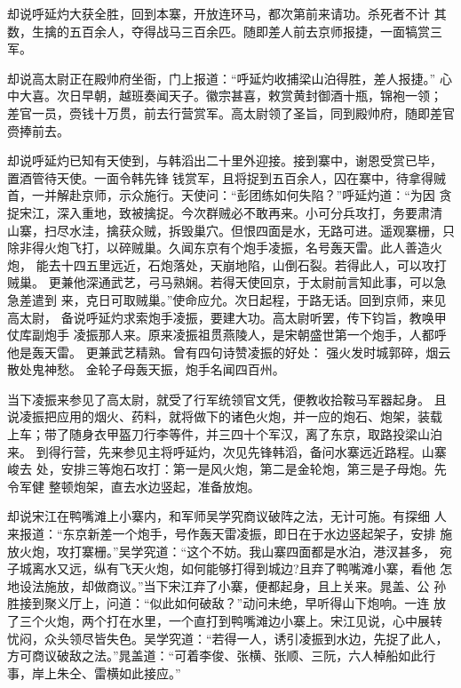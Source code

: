 却说呼延灼大获全胜，回到本寨，开放连环马，都次第前来请功。杀死者不计
其数，生擒的五百余人，夺得战马三百余匹。随即差人前去京师报捷，一面犒赏三
军。

却说高太尉正在殿帅府坐衙，门上报道：“呼延灼收捕梁山泊得胜，差人报捷。”
心中大喜。次日早朝，越班奏闻天子。徽宗甚喜，敕赏黄封御酒十瓶，锦袍一领；
差官一员，赍钱十万贯，前去行营赏军。高太尉领了圣旨，同到殿帅府，随即差官
赍捧前去。

却说呼延灼已知有天使到，与韩滔出二十里外迎接。接到寨中，谢恩受赏已毕，
置酒管待天使。一面令韩先锋钱赏军，且将捉到五百余人，囚在寨中，待拿得贼
首，一并解赴京师，示众施行。天使问：“彭团练如何失陷？”呼延灼道：“为因
贪捉宋江，深入重地，致被擒捉。今次群贼必不敢再来。小可分兵攻打，务要肃清
山寨，扫尽水洼，擒获众贼，拆毁巢穴。但恨四面是水，无路可进。遥观寨栅，只
除非得火炮飞打，以碎贼巢。久闻东京有个炮手凌振，名号轰天雷。此人善造火炮，
能去十四五里远近，石炮落处，天崩地陷，山倒石裂。若得此人，可以攻打贼巢。
更兼他深通武艺，弓马熟娴。若得天使回京，于太尉前言知此事，可以急急差遣到
来，克日可取贼巢。”使命应允。次日起程，于路无话。回到京师，来见高太尉，
备说呼延灼求索炮手凌振，要建大功。高太尉听罢，传下钧旨，教唤甲仗库副炮手
凌振那人来。原来凌振祖贯燕陵人，是宋朝盛世第一个炮手，人都呼他是轰天雷。
更兼武艺精熟。曾有四句诗赞凌振的好处：
强火发时城郭碎，烟云散处鬼神愁。
金轮子母轰天振，炮手名闻四百州。

当下凌振来参见了高太尉，就受了行军统领官文凭，便教收拾鞍马军器起身。
且说凌振把应用的烟火、药料，就将做下的诸色火炮，并一应的炮石、炮架，装载
上车；带了随身衣甲盔刀行李等件，并三四十个军汉，离了东京，取路投梁山泊来。
到得行营，先来参见主将呼延灼，次见先锋韩滔，备问水寨远近路程。山寨峻去
处，安排三等炮石攻打：第一是风火炮，第二是金轮炮，第三是子母炮。先令军健
整顿炮架，直去水边竖起，准备放炮。

却说宋江在鸭嘴滩上小寨内，和军师吴学究商议破阵之法，无计可施。有探细
人来报道：“东京新差一个炮手，号作轰天雷凌振，即日在于水边竖起架子，安排
施放火炮，攻打寨栅。”吴学究道：“这个不妨。我山寨四面都是水泊，港汊甚多，
宛子城离水又远，纵有飞天火炮，如何能够打得到城边?且弃了鸭嘴滩小寨，看他
怎地设法施放，却做商议。”当下宋江弃了小寨，便都起身，且上关来。晁盖、公
孙胜接到聚义厅上，问道：“似此如何破敌？”动问未绝，早听得山下炮响。一连
放了三个火炮，两个打在水里，一个直打到鸭嘴滩边小寨上。宋江见说，心中展转
忧闷，众头领尽皆失色。吴学究道：“若得一人，诱引凌振到水边，先捉了此人，
方可商议破敌之法。”晁盖道：“可着李俊、张横、张顺、三阮，六人棹船如此行
事，岸上朱仝、雷横如此接应。”

